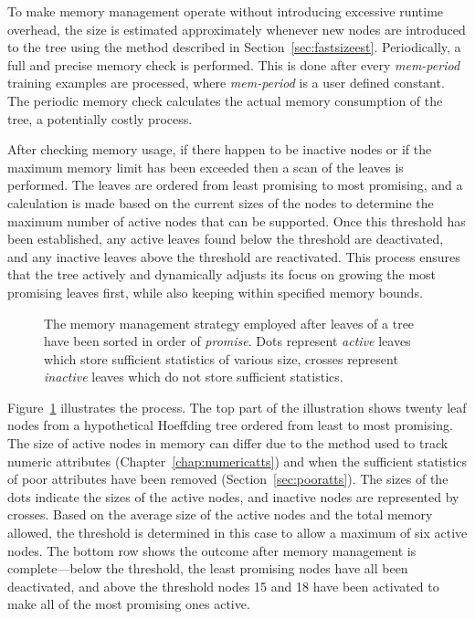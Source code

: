To make memory management operate without introducing excessive runtime overhead, the size is estimated approximately whenever new nodes are introduced to the tree using the method described in Section~\ref{sec:fastsizeest}. Periodically, a full and precise memory check is performed. This is done after every {\em mem-period} training examples are processed, where {\em mem-period} is a user defined constant. The periodic memory check calculates the actual memory consumption of the tree, a potentially costly process.

After checking memory usage, if there happen to be inactive nodes or if the maximum memory limit has been exceeded then a scan of the leaves is performed. The leaves are ordered from least promising to most promising, and a calculation is made based on the current sizes of the nodes to determine the maximum number of active nodes that can be supported. Once this threshold has been established, any active leaves found below the threshold are deactivated, and any inactive leaves above the threshold are reactivated. This process ensures that the tree actively and dynamically adjusts its focus on growing the most promising leaves first, while also keeping within specified memory bounds.

\begin{figure}
\centering
{}
\caption{The memory management strategy employed after leaves of a tree have been sorted in order of {\em promise}. Dots represent {\em active} leaves which store sufficient statistics of various size, crosses represent {\em inactive} leaves which do not store sufficient statistics.}
\label{fig:memmanage}
\end{figure}

Figure~\ref{fig:memmanage} illustrates the process. The top part of the illustration shows twenty leaf nodes from a hypothetical Hoeffding tree ordered from least to most promising. The size of active nodes in memory can differ due to the method used to track numeric attributes (Chapter~\ref{chap:numericatts}) and when the sufficient statistics of poor attributes have been removed (Section~\ref{sec:pooratts}). The sizes of the dots indicate the sizes of the active nodes, and inactive nodes are represented by crosses. Based on the average size of the active nodes and the total memory allowed, the threshold is determined in this case to allow a maximum of six active nodes. The bottom row shows the outcome after memory management is complete---below the threshold, the least promising nodes have all been deactivated, and above the threshold nodes 15 and 18 have been activated to make all of the most promising ones active.

